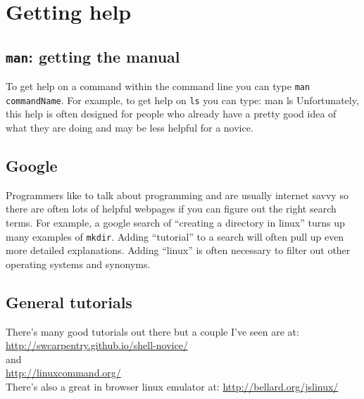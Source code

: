 \documentclass[12pt]{article}
\newenvironment{cmd}{\verbatim}{\endverbatim\vspace{5pt}}
\begin{document}
\section*{Getting help}
\subsection*{\texttt{man}: getting the manual}
To get help on a command within the command line you can type \texttt{man commandName}. For example, to get help on \texttt{ls} you can type:
\begin{cmd}
  man ls
\end{cmd}
Unfortunately, this help is often designed for people who already have a pretty good idea of what they are doing and may be less helpful for a novice.

\subsection*{Google}
Programmers like to talk about programming and are usually internet savvy so there are often lots of helpful webpages if you can figure out the right search terms. For example, a google search of ``creating a directory in linux'' turns up many examples of \texttt{mkdir}. Adding ``tutorial'' to a search will often pull up even more detailed explanations. Adding ``linux'' is often necessary to filter out other operating systems and synonyms.

\subsection*{General tutorials}
There's many good tutorials out there but a couple I've seen are at:\\
\url{http://swcarpentry.github.io/shell-novice/}\\
and\\
\url{http://linuxcommand.org/}\\
There's also a great in browser linux emulator at:
\url{http://bellard.org/jslinux/}
\end{document}
